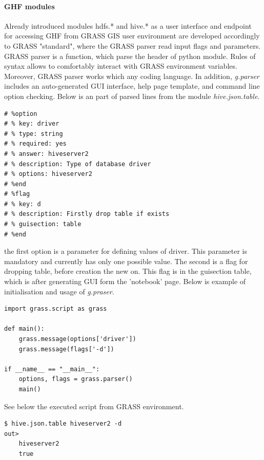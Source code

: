 \documentclass[a4paper,12pt,oneside]{report}
\begin{document}
\paragraph{GHF modules}
Already introduced modules hdfs.* and hive.* as a user interface and endpoint for accessing GHF from GRASS GIS user environment  are developed accordingly to GRASS "standard", where the GRASS parser read input flags and parameters. GRASS parser is a function, which parse the header of python module.  Rules of syntax allows to comfortably interact with GRASS environment variables. Moreover, GRASS parser works which any coding language. In addition, \textit{g.parser} includes an auto-generated GUI interface, help page template, and command line option checking. 
Below is an part of parsed lines from the module \textit{hive.json.table}.
\begin{footnotesize}
\begin{lstlisting}[style=python]
# %option
# % key: driver
# % type: string
# % required: yes
# % answer: hiveserver2
# % description: Type of database driver
# % options: hiveserver2
# %end
# %flag
# % key: d
# % description: Firstly drop table if exists
# % guisection: table
# %end
\end{lstlisting}
\end{footnotesize}
the first option is a parameter for defining values of driver. This parameter is mandatory and currently has only one possible value. The second is a flag for dropping table, before creation the new on. This flag is in the guisection table, which is after generating GUI form the 'notebook' page. Below is example of initialisation and usage of \textit{g.praser}.
\begin{footnotesize}
\begin{lstlisting}[style=python]
import grass.script as grass

def main():
	grass.message(options['driver'])
	grass.message(flags['-d'])
	
if __name__ == "__main__":
    options, flags = grass.parser()
    main()

\end{lstlisting}
\end{footnotesize}
See below the executed script from GRASS environment.
\begin{footnotesize}
\begin{lstlisting}[style=python]
$ hive.json.table hiveserver2 -d
out> 
	hiveserver2
	true
\end{lstlisting}
\end{footnotesize}
\end{document}
